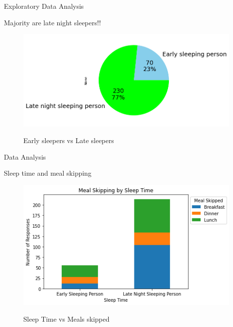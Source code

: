 \documentclass{beamer}
\begin{document}
\begin{frame}{Exploratory Data Analysis}
\begin{block}{Majority are late night sleepers!!}
\begin{figure}
      \centering
    \caption{Early sleepers vs Late sleepers}
    \includegraphics[scale = 0.55]{pie_sleep_categoty.png}  
    \label{fig:side-by-side}
\end{figure}
\end{block}
\end{frame}
\begin{frame}{Data Analysis}
\begin{block}{Sleep time and meal skipping}
\begin{figure}
      \centering
    \caption{Sleep Time vs Meals skipped }
    \includegraphics[scale = 0.55]{Meal Skipping - Sleep time Seg chart.png}  
    \label{sleep_seg}
\end{figure}
\end{block}
\end{frame}
\end{document}
